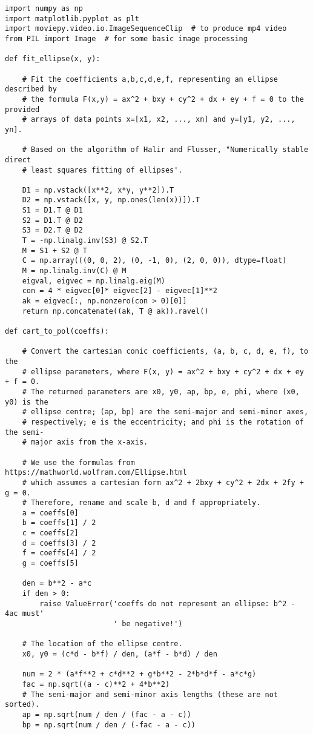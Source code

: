 \documentclass[oneside,10pt]{book}
\begin{document}
\begin{lstlisting}
import numpy as np
import matplotlib.pyplot as plt
import moviepy.video.io.ImageSequenceClip  # to produce mp4 video
from PIL import Image  # for some basic image processing

def fit_ellipse(x, y):

    # Fit the coefficients a,b,c,d,e,f, representing an ellipse described by
    # the formula F(x,y) = ax^2 + bxy + cy^2 + dx + ey + f = 0 to the provided
    # arrays of data points x=[x1, x2, ..., xn] and y=[y1, y2, ..., yn].

    # Based on the algorithm of Halir and Flusser, "Numerically stable direct
    # least squares fitting of ellipses'.

    D1 = np.vstack([x**2, x*y, y**2]).T
    D2 = np.vstack([x, y, np.ones(len(x))]).T
    S1 = D1.T @ D1
    S2 = D1.T @ D2
    S3 = D2.T @ D2
    T = -np.linalg.inv(S3) @ S2.T
    M = S1 + S2 @ T
    C = np.array(((0, 0, 2), (0, -1, 0), (2, 0, 0)), dtype=float)
    M = np.linalg.inv(C) @ M
    eigval, eigvec = np.linalg.eig(M)
    con = 4 * eigvec[0]* eigvec[2] - eigvec[1]**2
    ak = eigvec[:, np.nonzero(con > 0)[0]]
    return np.concatenate((ak, T @ ak)).ravel()

def cart_to_pol(coeffs):

    # Convert the cartesian conic coefficients, (a, b, c, d, e, f), to the
    # ellipse parameters, where F(x, y) = ax^2 + bxy + cy^2 + dx + ey + f = 0.
    # The returned parameters are x0, y0, ap, bp, e, phi, where (x0, y0) is the
    # ellipse centre; (ap, bp) are the semi-major and semi-minor axes,
    # respectively; e is the eccentricity; and phi is the rotation of the semi-
    # major axis from the x-axis.

    # We use the formulas from https://mathworld.wolfram.com/Ellipse.html
    # which assumes a cartesian form ax^2 + 2bxy + cy^2 + 2dx + 2fy + g = 0.
    # Therefore, rename and scale b, d and f appropriately.
    a = coeffs[0]
    b = coeffs[1] / 2
    c = coeffs[2]
    d = coeffs[3] / 2
    f = coeffs[4] / 2
    g = coeffs[5]

    den = b**2 - a*c
    if den > 0:
        raise ValueError('coeffs do not represent an ellipse: b^2 - 4ac must'
                         ' be negative!')

    # The location of the ellipse centre.
    x0, y0 = (c*d - b*f) / den, (a*f - b*d) / den

    num = 2 * (a*f**2 + c*d**2 + g*b**2 - 2*b*d*f - a*c*g)
    fac = np.sqrt((a - c)**2 + 4*b**2)
    # The semi-major and semi-minor axis lengths (these are not sorted).
    ap = np.sqrt(num / den / (fac - a - c))
    bp = np.sqrt(num / den / (-fac - a - c))


\end{lstlisting}
\end{document}
